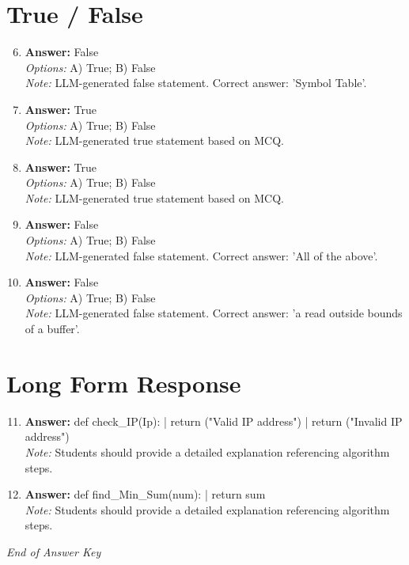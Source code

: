 \documentclass[12pt]{article}
\begin{document}
\section*{True / False}
\begin{enumerate}[label=\arabic*.]
\setcounter{enumi}{5}
\item \textbf{Answer:} False
\\ \textit{Options:} A) True; B) False
\\ \textit{Note:} LLM-generated false statement. Correct answer: 'Symbol Table'.
\item \textbf{Answer:} True
\\ \textit{Options:} A) True; B) False
\\ \textit{Note:} LLM-generated true statement based on MCQ.
\item \textbf{Answer:} True
\\ \textit{Options:} A) True; B) False
\\ \textit{Note:} LLM-generated true statement based on MCQ.
\item \textbf{Answer:} False
\\ \textit{Options:} A) True; B) False
\\ \textit{Note:} LLM-generated false statement. Correct answer: 'All of the above'.
\item \textbf{Answer:} False
\\ \textit{Options:} A) True; B) False
\\ \textit{Note:} LLM-generated false statement. Correct answer: 'a read outside bounds of a buffer'.
\end{enumerate}

\section*{Long Form Response}
\begin{enumerate}[label=\arabic*.]
\setcounter{enumi}{10}
\item \textbf{Answer:} def check\_IP(Ip): | return ("Valid IP address") | return ("Invalid IP address")
\\ \textit{Note:} Students should provide a detailed explanation referencing algorithm steps.
\item \textbf{Answer:} def find\_Min\_Sum(num): | return sum
\\ \textit{Note:} Students should provide a detailed explanation referencing algorithm steps.
\end{enumerate}

\vfill
\noindent\textit{End of Answer Key}
\end{document}
